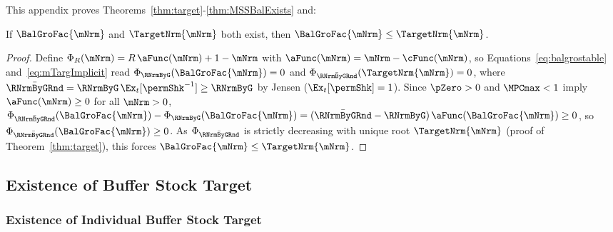 \documentclass[\econtexRoot/BufferStockTheory]{subfiles}
\begin{document}
This appendix proves Theorems~\ref{thm:target}-\ref{thm:MSSBalExists} and:
\compilingassubfile{\setcounter{theorem}{1}}

  \begin{lemma}
  If $\BalGroFac{\mNrm}$ and $\TargetNrm{\mNrm}$ both exist, then $\BalGroFac{\mNrm} \leq \TargetNrm{\mNrm}$.
  \end{lemma}
  \begin{proof}
  Define $\Phi_{R}(\mNrm)=R\,\aFunc(\mNrm)+1-\mNrm$ with $\aFunc(\mNrm)=\mNrm-\cFunc(\mNrm)$, so Equations~\eqref{eq:balgrostable} and~\eqref{eq:mTargImplicit} read $\Phi_{\RNrmByG}(\BalGroFac{\mNrm})=0$ and $\Phi_{\bar{\RNrmByGRnd}}(\TargetNrm{\mNrm})=0$, where $\bar{\RNrmByGRnd}=\RNrmByG\,\Ex_{t}[\permShk^{-1}]\geq\RNrmByG$ by Jensen ($\Ex_{t}[\permShk]=1$).
  Since $\pZero>0$ and $\MPCmax<1$ imply $\aFunc(\mNrm)\geq 0$ for all $\mNrm>0$, $\Phi_{\bar{\RNrmByGRnd}}(\BalGroFac{\mNrm})-\Phi_{\RNrmByG}(\BalGroFac{\mNrm})=(\bar{\RNrmByGRnd}-\RNrmByG)\,\aFunc(\BalGroFac{\mNrm})\geq 0$, so $\Phi_{\bar{\RNrmByGRnd}}(\BalGroFac{\mNrm})\geq 0$.
  As $\Phi_{\bar{\RNrmByGRnd}}$ is strictly decreasing with unique root $\TargetNrm{\mNrm}$ (proof of Theorem~\ref{thm:target}), this forces $\BalGroFac{\mNrm}\leq\TargetNrm{\mNrm}$.
  \end{proof}

\subsection{Existence of Buffer Stock Target}

\subsubsection{Existence of Individual Buffer Stock Target}\label{subsubsec:AppxIndividTarget} %
%
  
\end{document}
